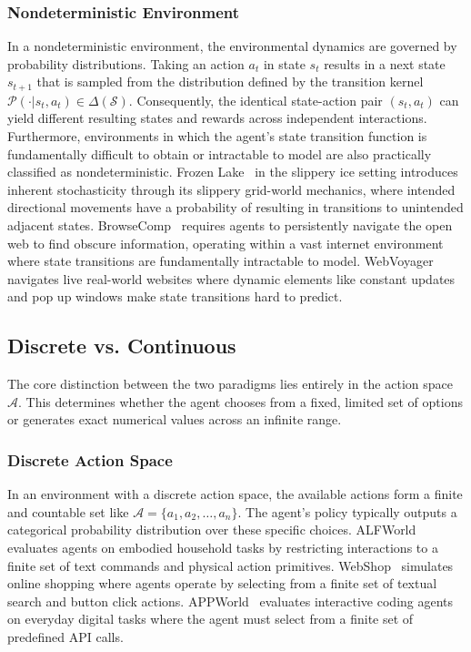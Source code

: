 \documentclass{llmxive}
\begin{document}
\subsubsection{Nondeterministic Environment}
In a nondeterministic environment, the environmental dynamics are governed by probability distributions. Taking an action $a_t$ in state $s_t$ results in a next state $s_{t+1}$ that is sampled from the distribution defined by the transition kernel $\mathcal{P}(\cdot | s_t, a_t) \in \Delta(\mathcal{S})$. Consequently, the identical state-action pair $(s_t, a_t)$ can yield different resulting states and rewards across independent interactions. Furthermore, environments in which the agent's state transition function is fundamentally difficult to obtain or intractable to model are also practically classified as nondeterministic. Frozen Lake~\cite{Openai_gym} in the slippery ice setting introduces inherent stochasticity through its slippery grid-world mechanics, where intended directional movements have a probability of resulting in transitions to unintended adjacent states. BrowseComp~\cite{BrowseComp} requires agents to persistently navigate the open web to find obscure information, operating within a vast internet environment where state transitions are fundamentally intractable to model. WebVoyager~\cite{WebVoyager} navigates live real-world websites where dynamic elements like constant updates and pop up windows make state transitions hard to predict.

\subsection{Discrete vs. Continuous}
\label{attribute:Discrete vs. Continuous}
The core distinction between the two paradigms lies entirely in the action space $\mathcal{A}$. This determines whether the agent chooses from a fixed, limited set of options or generates exact numerical values across an infinite range.

\subsubsection{Discrete Action Space}
In an environment with a discrete action space, the available actions form a finite and countable set like $\mathcal{A} = \{a_1, a_2, \dots, a_n\}$. The agent's policy typically outputs a categorical probability distribution over these specific choices. ALFWorld~\cite{ALFWorld} evaluates agents on embodied household tasks by restricting interactions to a finite set of text commands and physical action primitives. WebShop~\cite{WebShop} simulates online shopping where agents operate by selecting from a finite set of textual search and button click actions. APPWorld~\cite{AppWorld2024} evaluates interactive coding agents on everyday digital tasks where the agent must select from a finite set of predefined API calls.
\end{document}
